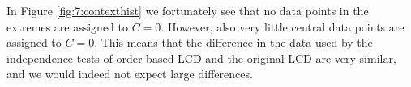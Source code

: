 In Figure \ref{fig:7:contexthist} we fortunately see that no data points in the extremes are assigned to $C=0$. However, also very little central data points are assigned to $C=0$. This means that the difference in the data used by the independence tests of order-based LCD and the original LCD are very similar, and we would indeed not expect large differences. 














